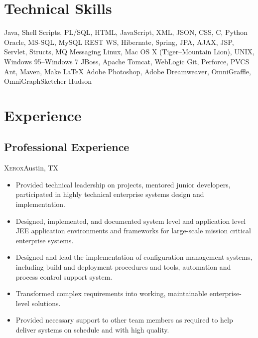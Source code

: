 \documentclass[11pt,letterpaper,sans]{moderncv}
\begin{document}
\section{Technical Skills}
         {Java, Shell Scripts, PL/SQL, HTML, JavaScript, XML, JSON, CSS, 
         C, Python}
         {Oracle, MS-SQL, MySQL}
         {REST WS, Hibernate, Spring, JPA, AJAX, JSP, Servlet, Structs, 
         MQ Messaging}
         {Linux, Mac OS X (Tiger--Mountain Lion), UNIX, Windows 95--Windows 7}
         {JBoss, Apache Tomcat, WebLogic}
         {Git, Perforce, PVCS}
         {Ant, Maven, Make}
         {\LaTeX}
         {Adobe Photoshop, Adobe Dreamweaver, OmniGraffle, OmniGraphSketcher}
         {Hudson}



\section{Experience}

  \subsection{Professional Experience}
     {\textsc{Xerox}}{Austin, TX}{}
     {\begin{itemize}
         \item Provided technical leadership on projects, mentored junior 
               developers, participated in highly technical enterprise 
               systems design and implementation.
         \item Designed, implemented, and documented system level and 
               application level JEE application environments and frameworks 
               for large-scale mission critical enterprise systems.
         \item Designed and lead the implementation of configuration 
               management systems, including build and deployment procedures 
               and tools, automation and process control support system.
         \item Transformed complex requirements into working, maintainable 
               enterprise-level solutions.
         \item Provided necessary support to other team members as required 
               to help deliver systems on schedule and with high quality.
     \end{itemize}}
      
\end{document}
